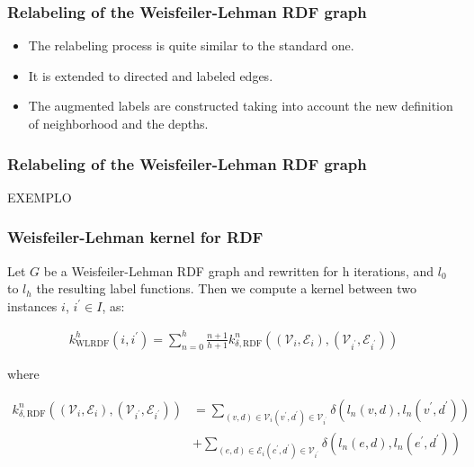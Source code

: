 \documentclass{beamer}
\begin{document}
\begin{frame}
\frametitle{Relabeling of the Weisfeiler-Lehman RDF graph}

\begin{itemize}
\item
The relabeling process is quite similar to the standard one.

\item
It is extended to directed and labeled edges.

\item
The augmented labels are constructed taking into account the new definition of neighborhood and the depths.
\end{itemize}

\end{frame}



\begin{frame}
\frametitle{Relabeling of the Weisfeiler-Lehman RDF graph}

EXEMPLO

\end{frame}



\begin{frame}
\frametitle{Weisfeiler-Lehman kernel for RDF}

\begin{definition}
Let $G$ be a Weisfeiler-Lehman RDF graph and rewritten for h iterations, and $l_0$ to $l_h$ the resulting label functions. Then we compute a kernel between two instances $i$, $i^\prime \in I$, as:

\begin{align}
k_{\mathrm{WLRDF}}^{h}\left(i, i^{\prime}\right)=\sum_{n=0}^{h} \frac{n+1}{h+1} k_{\delta, \mathrm{RDF}}^{n}\left(\left(\mathcal{V}_{i}, \mathcal{E}_{i}\right),\left(\mathcal{V}_{i^{\prime}}, \mathcal{E}_{i^{\prime}}\right)\right)
\end{align}

where

\begin{align}
k_{\delta, \mathrm{RDF}}^{n}\left(\left(\mathcal{V}_{i}, \mathcal{E}_{i}\right),\left(\mathcal{V}_{i^{\prime}}, \mathcal{E}_{i^{\prime}}\right)\right) &=\sum_{(v, d) \in \mathcal{V}_{i}\left(v^{\prime}, d^{\prime}\right) \in \mathcal{V}_{i^{\prime}}} \delta\left(l_{n}(v, d), l_{n}\left(v^{\prime}, d^{\prime}\right)\right) \\
&+\sum_{(e, d) \in \mathcal{E}_{i}\left(c^{\prime}, d^{\prime}\right) \in \mathcal{V}_{i^{\prime}}} \delta\left(l_{n}(e, d), l_{n}\left(e^{\prime}, d^{\prime}\right)\right)
\end{align}

\end{definition}

\end{frame}
\end{document}

